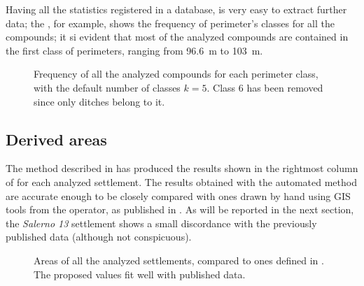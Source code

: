             Having all the statistics registered in a database, is very easy to extract further data; the , for example, shows the frequency of perimeter's classes for all the compounds; it si evident that most of the analyzed compounds are contained in the first class of perimeters, ranging from \SI{96.6}{\meter} to \SI{103}{\meter}.

            \begin{SCfigure}
                \caption[Frequency of all the analyzed compounds for each perimeter class, with $k=5$.]{Frequency of all the analyzed compounds for each perimeter class, with the default number of classes $k=5$. Class $6$ has been removed since only ditches belong to it.}
                \begin{tikzpicture}
                    
                \end{tikzpicture}
                \label{fig:graph-perim-class}
            \end{SCfigure}

        \subsection{Derived areas}

            The method described in  has produced the results shown in the rightmost column of  for each analyzed settlement. The results obtained with the automated method are accurate enough to be closely compared with ones drawn by hand using GIS tools from the operator, as published in \cite{laterza}.
            As will be reported in the next section, the \emph{Salerno 13} settlement shows a small discordance with the previously published data (although not conspicuous).

            \begin{figure}[H]
                \centering
                \begin{tikzpicture}
                    
                \end{tikzpicture}
                \caption[Areas of all the analyzed settlements compared with ones published in \cite{laterza}.]{Areas of all the analyzed settlements, compared to ones defined in \cite{laterza}. The proposed values fit well with published data.}
                \label{fig:graph-area}
            \end{figure}


